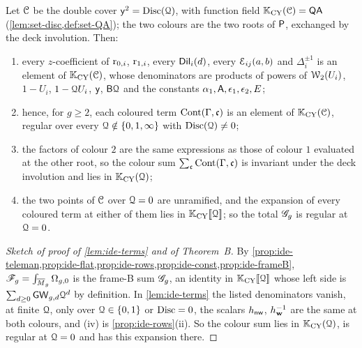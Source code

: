 \begin{lem}
\label{lem:ide-terms}
Let $\mathcal{C}$ be the double cover $\mathsf{y}^2=\operatorname{Disc}(\mathcal{Q})$, with function field $\mathbb{K}_{\mathrm{CY}}(\mathcal{C})=\mathsf{QA}$ (\cref{lem:set-disc,def:set-QA}); the two colours are the two roots of $\mathsf{P}$, exchanged by the deck involution. Then:
\begin{enumerate}
\item every $z$-coefficient of $\mathrm{r}_{0,i}$, $\mathrm{r}_{1,i}$, every $\mathsf{Dil}_i(d)$, every $\mathcal{E}_{ij}(a,b)$ and $\Delta_i^{\pm1}$ is an element of $\mathbb{K}_{\mathrm{CY}}(\mathcal{C})$, whose denominators are products of powers of $\mathcal{W}_2(U_i)$, $1-U_i$, $1-\mathcal{Q} U_i$, $\mathsf{y}$, $\mathsf{B}\mathcal{Q}$ and the constants $\alpha_1,\mathsf{A},\epsilon_1,\epsilon_2,E$;
\item hence, for $g\geq2$, each coloured term $\mathrm{Cont}(\Gamma,\mathfrak{c})$ is an element of $\mathbb{K}_{\mathrm{CY}}(\mathcal{C})$, regular over every $\mathcal{Q}\notin\{0,1,\infty\}$ with $\operatorname{Disc}(\mathcal{Q})\neq0$;
\item the factors of colour $2$ are the same expressions as those of colour $1$ evaluated at the other root, so the colour sum $\sum_{\mathfrak{c}}\mathrm{Cont}(\Gamma,\mathfrak{c})$ is invariant under the deck involution and lies in $\mathbb{K}_{\mathrm{CY}}(\mathcal{Q})$;
\item the two points of $\mathcal{C}$ over $\mathcal{Q}=0$ are unramified, and the expansion of every coloured term at either of them lies in $\mathbb{K}_{\mathrm{CY}}[\![ \mathcal{Q} ]\!]$; so the total $\mathscr{G}_g$ is regular at $\mathcal{Q}=0$.
\end{enumerate}
\end{lem}

\begin{proof}[Sketch of proof of \cref{lem:ide-terms} and of Theorem~B]
By \cref{prop:ide-teleman,prop:ide-flat,prop:ide-rows,prop:ide-const,prop:ide-frameB}, $\mathscr{F}_g=\int_{\overline{M}_g}\Omega_{g,0}$ is the frame-B sum $\mathscr{G}_g$, an identity in $\mathbb{K}_{\mathrm{CY}}[\![ \mathcal{Q} ]\!]$ whose left side is $\sum_{d\geq0}\mathsf{GW}_{g,d}\mathcal{Q}^d$ by definition. In \cref{lem:ide-terms} the listed denominators vanish, at finite $\mathcal{Q}$, only over $\mathcal{Q}\in\{0,1\}$ or $\operatorname{Disc}=0$, the scalars $h_{\mathsf{nw}}$, $h_{\mathbf{w}}^{-1}$ are the same at both colours, and (iv) is \cref{prop:ide-rows}(ii). So the colour sum lies in $\mathbb{K}_{\mathrm{CY}}(\mathcal{Q})$, is regular at $\mathcal{Q}=0$ and has this expansion there.
\end{proof}
